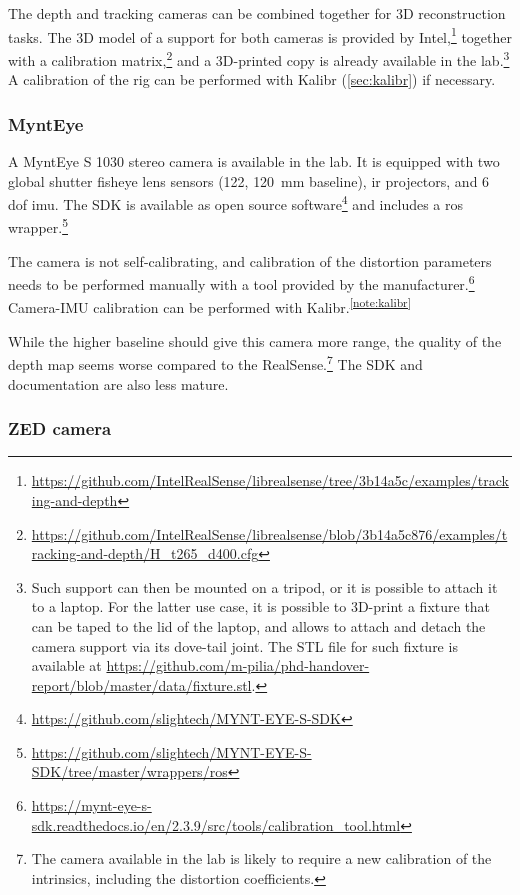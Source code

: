 \documentclass[11pt, letterpaper, twoside]{article}
\begin{document}
The depth and tracking cameras can be combined together for 3D reconstruction
tasks. The 3D model of a support for both cameras is provided by
Intel,\footnote{\url{https://github.com/IntelRealSense/librealsense/tree/3b14a5c/examples/tracking-and-depth}}
together with a calibration
matrix,\footnote{\url{https://github.com/IntelRealSense/librealsense/blob/3b14a5c876/examples/tracking-and-depth/H_t265_d400.cfg}}
and a 3D-printed copy is already available in the lab.\footnote{Such support
    can then be mounted on a tripod, or it is possible to attach it to a
    laptop. For the latter use case, it is possible to 3D-print a fixture that
    can be taped to the lid of the laptop, and allows to attach and detach the
    camera support via its dove-tail joint. The STL file for such fixture is
    available at
\url{https://github.com/m-pilia/phd-handover-report/blob/master/data/fixture.stl}.}
A calibration of the rig can be performed with Kalibr (\cref{sec:kalibr}) if
necessary.

\subsubsection{MyntEye}

A MyntEye S 1030 stereo camera is available in the lab. It is equipped with two
global shutter fisheye lens sensors (122\textdegree{}\textdegree,
120~mm baseline), \gls{ir} projectors, and 6 \gls{dof} \gls{imu}. The SDK is
available as open source
software\footnote{\url{https://github.com/slightech/MYNT-EYE-S-SDK}} and
includes a \gls{ros}
wrapper.\footnote{\url{https://github.com/slightech/MYNT-EYE-S-SDK/tree/master/wrappers/ros}}

The camera is not self-calibrating, and calibration of the distortion
parameters needs to be performed manually with a tool provided by the
manufacturer.\footnote{\url{https://mynt-eye-s-sdk.readthedocs.io/en/2.3.9/src/tools/calibration_tool.html}}
Camera-IMU calibration can be performed with
Kalibr.\textsuperscript{\ref{note:kalibr}}

While the higher baseline should give this camera more range, the quality of
the depth map seems worse compared to the RealSense.\footnote{The camera
available in the lab is likely to require a new calibration of the intrinsics,
including the distortion coefficients.} The SDK and documentation are also less
mature.

\subsubsection{ZED camera}
\end{document}
